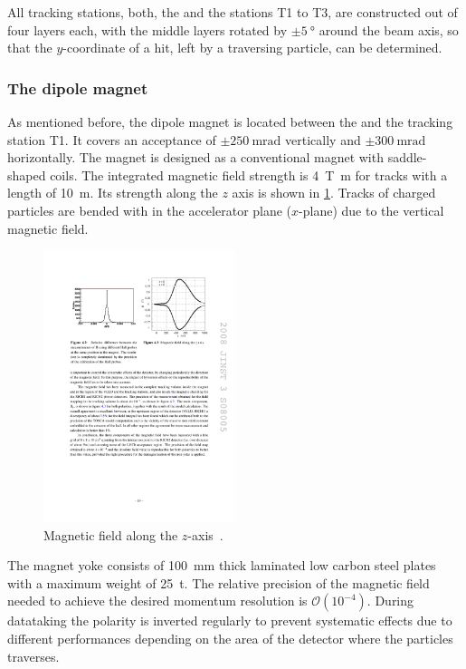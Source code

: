 All tracking stations, \ie both, the \ttracker and the stations T1 to T3, are constructed out of four layers each, with the middle layers rotated by $\pm\SI{5}{\degree}$ around the beam axis, so that the $y$-coordinate of a hit, left by a traversing particle, can be determined.

\subsubsection*{The dipole magnet}
\label{sec:magnet}

As mentioned before, the dipole magnet is located between the \ttracker and the tracking station T1.
It covers an acceptance of $\pm\SI{250}{\milli\radian}$ vertically and $\pm\SI{300}{\milli\radian}$ horizontally.
The magnet is designed as a conventional magnet with saddle-shaped coils.
The integrated magnetic field strength is \SI{4}{\tesla\metre} for tracks with a length of \SI{10}{\metre}.
Its strength along the $z$ axis is shown in \cref{fig:MagField}.
Tracks of charged particles are bended with in the accelerator plane ($x$-plane) due to the vertical magnetic field.
\begin{figure}[tbp]
    \centering
    \includegraphics[width=0.5\textwidth]{05lhcb/figs/magnetField.pdf}
    \caption{Magnetic field along the $z$-axis~\cite{Alves:2008zz}.}
    \label{fig:MagField}
\end{figure}
The magnet yoke consists of \SI{100}{\milli\metre} thick laminated low carbon steel plates with a maximum weight of \SI{25}{\tonne}.
The relative precision of the magnetic field needed to achieve the desired momentum resolution is $\mathcal{O}\!\left(10^{-4}\right)$.
During datataking the polarity is inverted regularly to prevent systematic effects due to \eg different performances depending on the area of the detector where the particles traverses.

